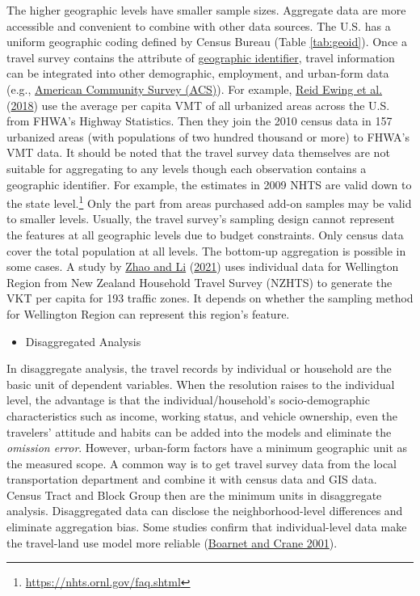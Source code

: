 \documentclass[
  12pt,
]{article}
\providecommand{\tightlist}{%
  \setlength{\itemsep}{0pt}\setlength{\parskip}{0pt}}
\begin{document}
The higher geographic levels have smaller sample sizes. Aggregate data are more accessible and convenient to combine with other data sources. The U.S. has a uniform geographic coding defined by Census Bureau (Table \ref{tab:geoid}). Once a travel survey contains the attribute of \href{https://www.census.gov/programs-surveys/geography/guidance/geo-identifiers.html}{geographic identifier}, travel information can be integrated into other demographic, employment, and urban-form data (e.g., \href{https://www.census.gov/programs-surveys/decennial-census/about/census-acs.html}{American Community Survey (ACS)}). For example, \protect\hyperlink{ref-ewingTestingNewmanKenworthy2018}{Reid Ewing et al.} (\protect\hyperlink{ref-ewingTestingNewmanKenworthy2018}{2018}) use the average per capita VMT of all urbanized areas across the U.S. from FHWA's Highway Statistics. Then they join the 2010 census data in 157 urbanized areas (with populations of two hundred thousand or more) to FHWA's VMT data. It should be noted that the travel survey data themselves are not suitable for aggregating to any levels though each observation contains a geographic identifier. For example, the estimates in 2009 NHTS are valid down to the state level.\footnote{\url{https://nhts.ornl.gov/faq.shtml}} Only the part from areas purchased add-on samples may be valid to smaller levels. Usually, the travel survey's sampling design cannot represent the features at all geographic levels due to budget constraints. Only census data cover the total population at all levels. The bottom-up aggregation is possible in some cases. A study by \protect\hyperlink{ref-zhaoRethinkingDeterminantsVehicle2021}{Zhao and Li} (\protect\hyperlink{ref-zhaoRethinkingDeterminantsVehicle2021}{2021}) uses individual data for Wellington Region from New Zealand Household Travel Survey (NZHTS) to generate the VKT per capita for 193 traffic zones. It depends on whether the sampling method for Wellington Region can represent this region's feature.

\begin{itemize}
\tightlist
\item
  Disaggregated Analysis
\end{itemize}

In disaggregate analysis, the travel records by individual or household are the basic unit of dependent variables. When the resolution raises to the individual level, the advantage is that the individual/household's socio-demographic characteristics such as income, working status, and vehicle ownership, even the travelers' attitude and habits can be added into the models and eliminate the \emph{omission error}. However, urban-form factors have a minimum geographic unit as the measured scope. A common way is to get travel survey data from the local transportation department and combine it with census data and GIS data. Census Tract and Block Group then are the minimum units in disaggregate analysis. Disaggregated data can disclose the neighborhood-level differences and eliminate aggregation bias. Some studies confirm that individual-level data make the travel-land use model more reliable (\protect\hyperlink{ref-boarnetInfluenceLandUse2001}{Boarnet and Crane 2001}).
\end{document}
